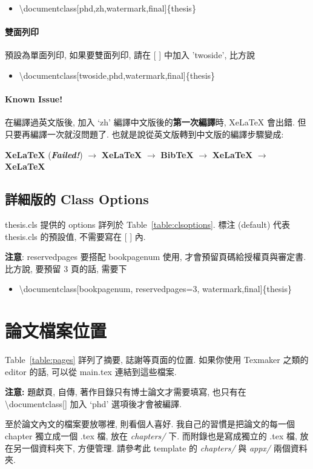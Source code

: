 \begin{itemize}
\item \textbackslash documentclass[phd,zh,watermark,final]\{thesis\}
\end{itemize}

\paragraph{雙面列印} 預設為單面列印, 如果要雙面列印, 請在 [ ] 中加入 'twoside', 比方說

\begin{itemize}
\item \textbackslash documentclass[twoside,phd,watermark,final]\{thesis\}
\end{itemize}

\paragraph{Known Issue!} 在編譯過英文版後, 加入 `zh' 編譯中文版後的\textbf{第一次編譯}時, XeLaTeX 會出錯.
但只要再編譯一次就沒問題了.
也就是說從英文版轉到中文版的編譯步驟變成:

\hspace{2em} \textbf{XeLaTeX} (\textbf{\textit{Failed!}}) $\rightarrow$ \textbf{XeLaTeX} $\rightarrow$ \textbf{BibTeX} $\rightarrow$ \textbf{XeLaTeX} $\rightarrow$ \textbf{XeLaTeX}

\subsection{詳細版的 Class Options}

thesis.cls 提供的 options 詳列於 Table~\ref{table:clsoptions}.
標注 (default) 代表 thesis.cls 的預設值, 不需要寫在 [ ] 內.



\textbf{注意}: reservedpages 要搭配 bookpagenum 使用, 才會預留頁碼給授權頁與審定書.
比方說, 要預留 3 頁的話, 需要下

\begin{itemize}
\item \textbackslash documentclass[bookpagenum, reservedpages=3, watermark,final]\{thesis\}
\end{itemize}

\section{論文檔案位置}

Table~\ref{table:pages} 詳列了摘要, 誌謝等頁面的位置.
如果你使用 Texmaker 之類的 editor 的話, 可以從 main.tex 連結到這些檔案.

\textbf{注意:} 題獻頁, 自傳, 著作目錄只有博士論文才需要填寫, 也只有在 \textbackslash documentclass[] 加入 `phd' 選項後才會被編譯.



至於論文內文的檔案要放哪裡, 則看個人喜好.
我自己的習慣是把論文的每一個 chapter 獨立成一個 .tex 檔, 放在 \textit{chapters/} 下.
而附錄也是寫成獨立的 .tex 檔, 放在另一個資料夾下, 方便管理.
請參考此 template 的 \textit{chapters/} 與 \textit{appx/} 兩個資料夾.

